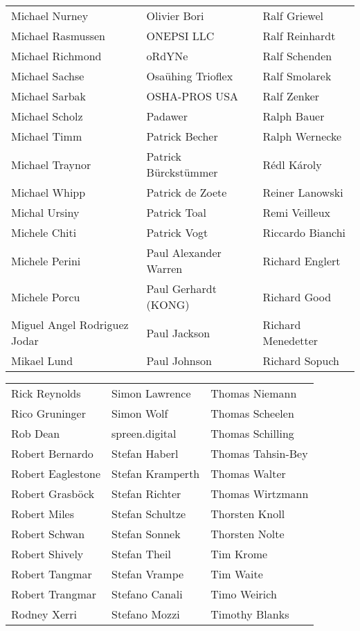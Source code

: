 \begin{small}
\begin{tabular}{p{4cm}p{4cm}p{4cm}}
Michael Nurney & Olivier Bori & Ralf Griewel \\
Michael Rasmussen & ONEPSI LLC & Ralf Reinhardt \\
Michael Richmond & oRdYNe & Ralf Schenden \\
Michael Sachse & Osaühing Trioflex & Ralf Smolarek \\
Michael Sarbak & OSHA-PROS USA & Ralf Zenker \\
Michael Scholz & Padawer & Ralph Bauer \\
Michael Timm & Patrick Becher & Ralph Wernecke \\
Michael Traynor & Patrick Bürckstümmer & Rédl Károly \\
Michael Whipp & Patrick de Zoete & Reiner Lanowski \\
Michal Ursiny & Patrick Toal & Remi Veilleux \\
Michele Chiti & Patrick Vogt & Riccardo Bianchi \\
Michele Perini & Paul Alexander Warren & Richard Englert \\
Michele Porcu & Paul Gerhardt (KONG) & Richard Good \\
Miguel Angel Rodriguez Jodar & Paul Jackson & Richard Menedetter \\
Mikael Lund & Paul Johnson & Richard Sopuch \\
\end{tabular}
\newpage
\setlength{\tabcolsep}{1mm}
\begin{tabular}{p{4cm}p{4cm}p{4cm}}
Rick Reynolds & Simon Lawrence & Thomas Niemann \\
Rico Gruninger & Simon Wolf & Thomas Scheelen \\
Rob Dean & spreen.digital & Thomas Schilling \\
Robert Bernardo & Stefan Haberl & Thomas Tahsin-Bey \\
Robert Eaglestone & Stefan Kramperth & Thomas Walter \\
Robert Grasböck & Stefan Richter & Thomas Wirtzmann \\
Robert Miles & Stefan Schultze & Thorsten Knoll \\
Robert Schwan & Stefan Sonnek & Thorsten Nolte \\
Robert Shively & Stefan Theil & Tim Krome \\
Robert Tangmar & Stefan Vrampe & Tim Waite \\
Robert Trangmar & Stefano Canali & Timo Weirich \\
Rodney Xerri & Stefano Mozzi & Timothy Blanks \\

\end{tabular}
\end{small}
